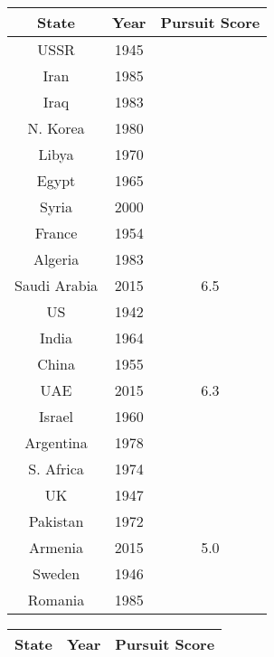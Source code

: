 \begin{table}
  \centering
  \begin{minipage}{.5\textwidth}

\begin{tabular}{|c|c|c|}
\hline
\textbf{State} & \textbf{Year}  & \textbf{Pursuit Score} \\
\hline
USSR & 1945 & \textbf{\color{red}{8.9}} \\
Iran & 1985 & \textbf{\color{red}{8.3}} \\
Iraq & 1983 & \textbf{\color{red}{8.2}} \\
N. Korea & 1980 & \textbf{\color{red}{7.7}} \\
Libya & 1970 & \textbf{\color{red}{7.4}} \\
Egypt & 1965 & \textbf{\color{red}{7.3}} \\
Syria & 2000 & \textbf{\color{red}{6.9}} \\
France & 1954 & \textbf{\color{red}{6.8}} \\
Algeria & 1983 & \textbf{\color{red}{6.6}} \\
Saudi Arabia & 2015 & 6.5 \\
US & 1942 & \textbf{\color{red}{6.5}} \\
India & 1964 & \textbf{\color{red}{6.4}} \\
China & 1955 & \textbf{\color{red}{6.3}} \\
UAE & 2015 & 6.3 \\
Israel & 1960 & \textbf{\color{red}{6.2}} \\
Argentina & 1978 & \textbf{\color{red}{6.1}} \\
S. Africa & 1974 & \textbf{\color{red}{5.9}} \\
UK & 1947 & \textbf{\color{red}{5.8}} \\
Pakistan & 1972 & \textbf{\color{red}{5.3}} \\
Armenia & 2015 & 5.0 \\
Sweden & 1946 & \textbf{\color{red}{4.8}} \\
Romania & 1985 & \textbf{\color{red}{4.5}} \\

\hline
\end{tabular}
\end{minipage}\hfill
\begin{minipage}{.5\textwidth}
\begin{tabular}{|c|c|c|}
\hline
\textbf{State} & \textbf{Year}  & \textbf{Pursuit Score} \\
\hline


\end{tabular}
\end{minipage}
\end{table}
